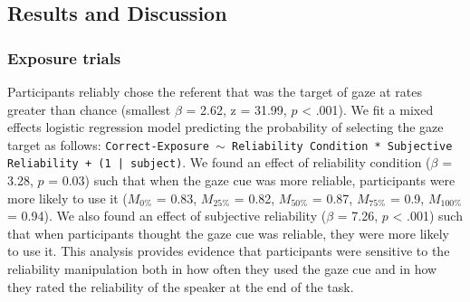 \documentclass[oneside]{report}
\begin{document}
\subsection{Results and Discussion}\label{results-and-discussion-3}

\subsubsection{Exposure trials}\label{exposure-trials-2}

Participants reliably chose the referent that was the target of gaze at
rates greater than chance (smallest \(\beta\) = 2.62, z = 31.99, \(p\)
\textless{} .001). We fit a mixed effects logistic regression model
predicting the probability of selecting the gaze target as follows:
\texttt{Correct-Exposure $\sim$ Reliability Condition * Subjective Reliability + (1 | subject)}.
We found an effect of reliability condition (\(\beta\) = 3.28, \(p\) =
0.03) such that when the gaze cue was more reliable, participants were
more likely to use it (\(M_{0\%}\) = 0.83, \(M_{25\%}\) = 0.82,
\(M_{50\%}\) = 0.87, \(M_{75\%}\) = 0.9, \(M_{100\%}\) = 0.94). We also
found an effect of subjective reliability (\(\beta\) = 7.26, \(p\)
\textless{} .001) such that when participants thought the gaze cue was
reliable, they were more likely to use it. This analysis provides
evidence that participants were sensitive to the reliability
manipulation both in how often they used the gaze cue and in how they
rated the reliability of the speaker at the end of the task.
\end{document}
